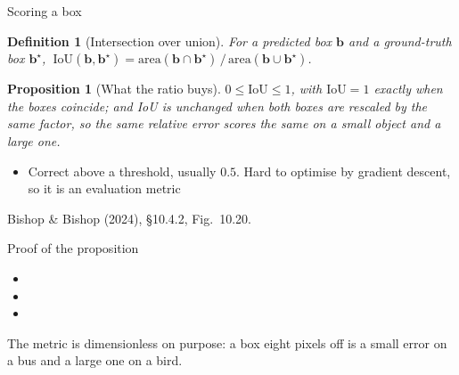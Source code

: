 \documentclass[aspectratio=169, 11pt]{beamer}
\newtheorem{propx}[theorem]{Proposition}
\newtheorem{defx}[theorem]{Definition}
\newcommand{\srcline}[1]{%
  \par\vspace{0.25em}%
  {\scriptsize\color{mcMuted}\hfill #1\par}}
\newcommand{\src}[3]{}      %
\newcommand{\nosrc}{}       %
\begin{document}
\begin{frame}{Scoring a box}
  \src{bishop2024}{section}{10.4.2}
  \vspace{-0.3em}
  \begin{defx}[Intersection over union]\label{th:iou}
    \small
    For a predicted box $\mathbf{b}$ and a ground-truth box $\mathbf{b}^\star$,
    $\ \mathrm{IoU}(\mathbf{b}, \mathbf{b}^\star) =
      \mathrm{area}(\mathbf{b} \cap \mathbf{b}^\star)\,/\,
      \mathrm{area}(\mathbf{b} \cup \mathbf{b}^\star)$.
  \end{defx}
  \vspace{-0.3em}
  \begin{propx}[What the ratio buys]\label{th:iouprop}
    \small
    $0 \leq \mathrm{IoU} \leq 1$, with $\mathrm{IoU} = 1$ exactly when
    the boxes coincide; and IoU is unchanged when both boxes are
    rescaled by the same factor, so the same relative error scores the
    same on a small object and a large one.
  \end{propx}
  \vspace{-0.15em}
  {\footnotesize
  \begin{itemize}\itemsep0.1em
    \item Correct above a threshold, usually $0.5$. Hard to optimise by
          gradient descent, so it is an \alert{evaluation} metric
  \end{itemize}}
  \vspace{-0.3em}
  \srcline{Bishop \& Bishop (2024), \S10.4.2, Fig.~10.20.}
\end{frame}

\begin{frame}{Proof of the proposition}
  \nosrc
  \vspace{-0.25em}
  {\footnotesize
  \begin{itemize}\itemsep0.30em
    \item {}
    \item {}
    \item {}
  \end{itemize}}
  \vspace{-0.1em}
  \begin{redhighlight}
    The metric is dimensionless on purpose: a box eight pixels off is
    a small error on a bus and a large one on a bird.
  \end{redhighlight}
\end{frame}
\end{document}
